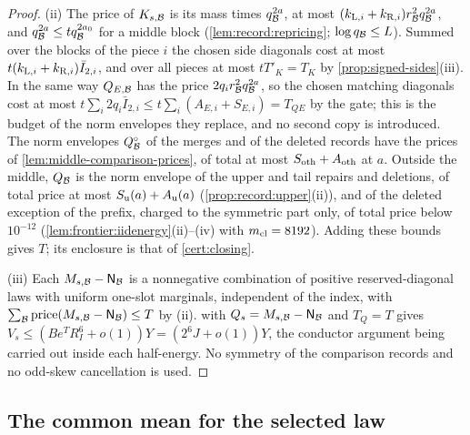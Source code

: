 \begin{proof}
(ii) The price of $K_{s,\mathcal B}$ is its mass times $q_\mathcal B^{2a}$, at most
$(k_{{\rm L},i}+k_{{\rm R},i})r_\mathcal B^2q_\mathcal B^{2a}$, and $q_\mathcal B^{2a}\le tq_\mathcal B^{2a_0}$ for a
middle block (\cref{lem:record:repricing}; $\log q_\mathcal B\le L$). Summed over the
blocks of the piece $i$ the chosen side diagonals cost at most
$t(k_{{\rm L},i}+k_{{\rm R},i})\bar I_{2,i}$, and over all pieces at most $tT'_K=T_K$
by \cref{prop:signed-sides}(iii). In the same way $Q_{E,\mathcal B}$ has the price
$2q_ir_\mathcal B^2q_\mathcal B^{2a}$, so the chosen matching diagonals cost at most
$t\sum_i2q_i\bar I_{2,i}\le t\sum_i(A_{E,i}+S_{E,i})=T_{QE}$ by the gate; this is
the budget of the norm envelopes they replace, and no second copy is
introduced. The norm envelopes $Q^\circ_\mathcal B$ of the merges and of the deleted
records have the prices of \cref{lem:middle-comparison-prices}, of total at most
$S_{\rm oth}+A_{\rm oth}$ at $a$. Outside the middle, $Q_\mathcal B$ is the norm envelope
of the upper and tail repairs and deletions, of total price at most
$S_{\rm u}(a)+A_{\rm u}(a)$ (\cref{prop:record:upper}(ii)), and of the deleted
exception of the prefix, charged to the symmetric part only, of total price
below $10^{-12}$ (\cref{lem:frontier:iidenergy}(ii)--(iv) with $m_{\mathrm{cl}}=8192$). Adding
these bounds gives $T$; its enclosure is that of \cref{cert:closing}.

(iii) Each $M_{s,\mathcal B}-\mathsf N_\mathcal B$ is a nonnegative combination of positive
reserved-diagonal laws with uniform one-slot marginals, independent of the
index, with $\sum_\mathcal B\operatorname{price}(M_{s,\mathcal B}-\mathsf N_\mathcal B)\le T$ by (ii).  with
$Q_s=M_{s,\mathcal B}-\mathsf N_\mathcal B$ and $T_Q=T$ gives $V_s\le(Be^TR_I^6+o(1))Y=
(2^6J+o(1))Y$, the conductor argument being carried out inside each
half-energy. No symmetry of the comparison records and no odd-skew
cancellation is used.
\end{proof}

\subsection{The common mean for the selected law}\label{subsec:cm-selected}

